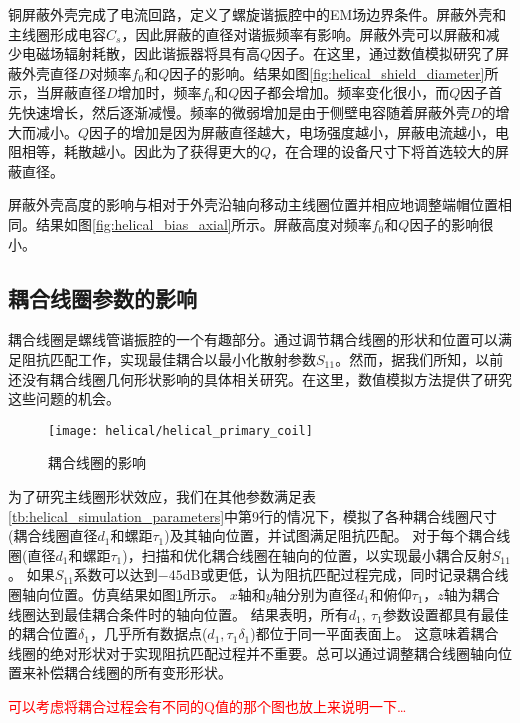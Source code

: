 铜屏蔽外壳完成了电流回路，定义了螺旋谐振腔中的EM场边界条件。屏蔽外壳和主线圈形成电容$C_s$，因此屏蔽的直径对谐振频率有影响。屏蔽外壳可以屏蔽和减少电磁场辐射耗散，因此谐振器将具有高$Q$因子。在这里，通过数值模拟研究了屏蔽外壳直径$ D $对频率$f_0$和$ Q $因子的影响。结果如图\ref{fig:helical_shield_diameter}所示，当屏蔽直径$ D $增加时，频率$f_0$和$ Q $因子都会增加。频率变化很小，而$ Q $因子首先快速增长，然后逐渐减慢。频率的微弱增加是由于侧壁电容随着屏蔽外壳$D$的增大而减小。$Q$因子的增加是因为屏蔽直径越大，电场强度越小，屏蔽电流越小，电阻相等，耗散越小。因此为了获得更大的$Q$，在合理的设备尺寸下将首选较大的屏蔽直径。

屏蔽外壳高度的影响与相对于外壳沿轴向移动主线圈位置并相应地调整端帽位置相同。结果如图\ref{fig:helical_bias_axial}所示。屏蔽高度对频率$f_0$和$Q$因子的影响很小。

\subsection[耦合线圈参数的影响]{耦合线圈参数的影响}

耦合线圈是螺线管谐振腔的一个有趣部分。通过调节耦合线圈的形状和位置可以满足阻抗匹配工作，实现最佳耦合以最小化散射参数$S_{11}$。然而，据我们所知，以前还没有耦合线圈几何形状影响的具体相关研究。在这里，数值模拟方法提供了研究这些问题的机会。

\begin{figure}
    \centering
    \caption[耦合线圈的影响]{耦合线圈的影响\label{fig:helical_primary_coil}}
    \texttt{[image: helical/helical\_primary\_coil]}
\end{figure}

为了研究主线圈形状效应，我们在其他参数满足表\ref{tb:helical_simulation_parameters}中第9行的情况下，模拟了各种耦合线圈尺寸(耦合线圈直径$d_1$和螺距$\tau_1$)及其轴向位置，并试图满足阻抗匹配。
对于每个耦合线圈(直径$d_1$和螺距$\tau_1$)，扫描和优化耦合线圈在轴向的位置，以实现最小耦合反射$S_{11}$。
如果$S_{11}$系数可以达到$-45$dB或更低，认为阻抗匹配过程完成，同时记录耦合线圈轴向位置。仿真结果如图\ref{fig:helical_primary_coil}所示。
$x$轴和$y$轴分别为直径$d_1$和俯仰$\tau_1$，$z$轴为耦合线圈达到最佳耦合条件时的轴向位置。
结果表明，所有$ d_1,\ \tau_1 $参数设置都具有最佳的耦合位置$ \delta_1$，几乎所有数据点($d_1,\tau_1\delta_1$)都位于同一平面表面上。
这意味着耦合线圈的绝对形状对于实现阻抗匹配过程并不重要。总可以通过调整耦合线圈轴向位置来补偿耦合线圈的所有变形形状。



\textcolor{red}{可以考虑将耦合过程会有不同的Q值的那个图也放上来说明一下\dots}

